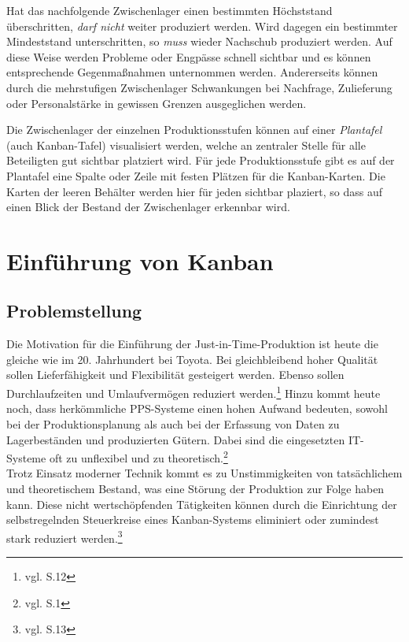 Hat das nachfolgende Zwischenlager einen bestimmten Höchststand überschritten, \emph{darf nicht} weiter produziert werden.
Wird dagegen ein bestimmter Mindeststand unterschritten, so \emph{muss} wieder Nachschub produziert werden.
Auf diese Weise werden Probleme oder Engpässe schnell sichtbar und es können entsprechende Gegenmaßnahmen unternommen werden.
Andererseits können durch die mehrstufigen Zwischenlager Schwankungen bei Nachfrage, Zulieferung oder Personalstärke in gewissen Grenzen ausgeglichen werden.

Die Zwischenlager der einzelnen Produktionsstufen können auf einer \emph{Plantafel} (auch Kanban-Tafel) visualisiert werden, welche an zentraler Stelle für alle Beteiligten gut sichtbar platziert wird.
Für jede Produktionsstufe gibt es auf der Plantafel eine Spalte oder Zeile mit festen Plätzen für die Kanban-Karten.
Die Karten der leeren Behälter werden hier für jeden sichtbar plaziert, so dass auf einen Blick der Bestand der Zwischenlager erkennbar wird.

\section{Einführung von Kanban}
\subsection{Problemstellung}
Die Motivation für die Einführung der Just-in-Time-Produktion ist heute die gleiche wie im 20. Jahrhundert bei Toyota.
Bei gleichbleibend hoher Qualität sollen Lieferfähigkeit und Flexibilität gesteigert werden.
Ebenso sollen Durchlaufzeiten und Umlaufvermögen reduziert werden.\footnote{vgl. \cite{Geiger2011Kanban} S.12}
Hinzu kommt heute noch, dass herkömmliche PPS-Systeme einen hohen Aufwand bedeuten, 
sowohl bei der Produktionsplanung als auch bei der Erfassung von Daten zu Lagerbeständen und produzierten Gütern.
Dabei sind die eingesetzten IT-Systeme oft zu unflexibel und zu theoretisch.\footnote{vgl. \cite{Weber2014KE} S.1}\\
Trotz Einsatz moderner Technik kommt es zu Unstimmigkeiten von tatsächlichem und theoretischem Bestand, 
was eine Störung der Produktion zur Folge haben kann.
Diese nicht wertschöpfenden Tätigkeiten können durch die Einrichtung der selbstregelnden 
Steuerkreise eines Kanban-Systems eliminiert oder zumindest stark reduziert werden.\footnote{vgl. \cite{Geiger2011Kanban} S.13}

